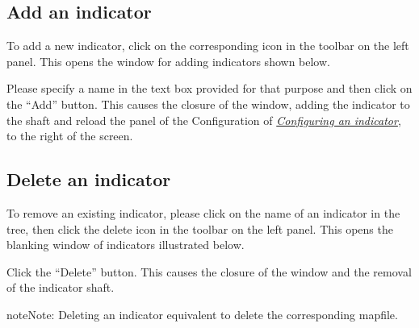 \documentclass[letterpaper,10pt,english]{sphinxmanual}
\begin{document}
\subsection{Add an indicator}
\label{indicators/indicatorstree:ajouter-un-indicateur}
To add a new indicator, click on the corresponding icon in the toolbar on the left panel. This opens the window for adding indicators shown below.


Please specify a name in the text box provided for that purpose and then click on the ``Add'' button. This causes the closure of the window, adding the indicator to the shaft and reload the panel of the Configuration of {\hyperref[indicators/indicatorspanel::doc]{\emph{\emph{Configuring an indicator}}}}, to the right of the screen.


\subsection{Delete an indicator}
\label{indicators/indicatorstree:supprimer-un-indicateur}
To remove an existing indicator, please click on the name of an indicator in the tree, then click the delete icon in the toolbar on the left panel. This opens the blanking window of indicators illustrated below.


Click the ``Delete'' button. This causes the closure of the window and the removal of the indicator shaft.

\begin{notice}{note}{Note:}
Deleting an indicator equivalent to delete the corresponding mapfile.
\end{notice}
\end{document}
